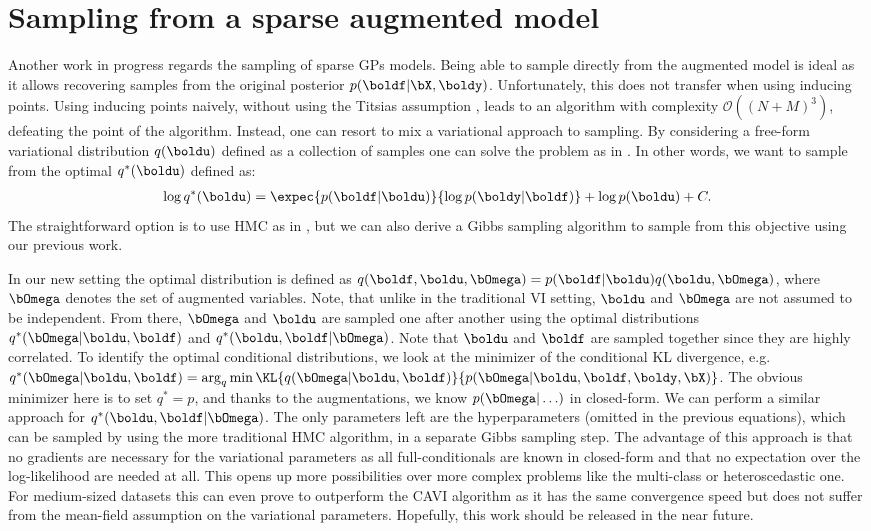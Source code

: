\section{Sampling from a sparse augmented model}

Another work in progress regards the sampling of sparse \ac{GPs} models.
Being able to sample directly from the augmented model is ideal as it allows recovering samples from the original posterior $p(\boldf|\bX,\boldy)$.
Unfortunately, this does not transfer when using inducing points.
Using inducing points naively, without using the Titsias assumption \cite{Titsias2009}, leads to an algorithm with complexity $\mathcal{O}((N+M)^3)$, defeating the point of the algorithm.
Instead, one can resort to mix a variational approach to sampling.
By considering a free-form variational distribution $q(\boldu)$ defined as a collection of samples one can solve the problem as in \citet{hensmanMCMCVariationallySparse2015}.
In other words, we want to sample from the optimal $q^*(\boldu)$ defined as:
\begin{align*}
    \log q^*(\boldu) = \expec{p(\boldf|\boldu)}{\log p(\boldy|\boldf)} + \log p(\boldu) + C.
\end{align*}
The straightforward option is to use \ac{HMC} as in \cite{hensmanMCMCVariationallySparse2015}, but we can also derive a Gibbs sampling algorithm to sample from this objective using our previous work.

In our new setting the optimal distribution is defined as $q(\boldf,\boldu,\bOmega) = p(\boldf|\boldu)q(\boldu, \bOmega)$, where $\bOmega$ denotes the set of augmented variables.
Note, that unlike in the traditional \ac{VI} setting, $\boldu$ and $\bOmega$ are not assumed to be independent.
From there, $\bOmega$ and $\boldu$ are sampled one after another using the optimal distributions $q^*(\bOmega|\boldu,\boldf)$ and $q^*(\boldu,\boldf|\bOmega)$.
Note that $\boldu$ and $\boldf$ are sampled together since they are highly correlated.
To identify the optimal conditional distributions, we look at the minimizer of the conditional \ac{KL} divergence, e.g. $q^*(\bOmega|\boldu,\boldf) = \arg_{q} \min \KL{q(\bOmega|\boldu,\boldf)}{p(\bOmega|\boldu,\boldf,\boldy,\bX)}$.
The obvious minimizer here is to set $q^*=p$, and thanks to the augmentations, we know $p(\bOmega|\ldots)$ in closed-form.
We can perform a similar approach for $q^*(\boldu,\boldf|\bOmega)$.
The only parameters left are the hyperparameters (omitted in the previous equations), which can be sampled by using the more traditional \ac{HMC} algorithm, in a separate Gibbs sampling step.
The advantage of this approach is that no gradients are necessary for the variational parameters as all full-conditionals are known in closed-form and that no expectation over the log-likelihood are needed at all.
This opens up more possibilities over more complex problems like the multi-class or heteroscedastic one.
For medium-sized datasets this can even prove to outperform the \ac{CAVI} algorithm as it has the same convergence speed but does not suffer from the mean-field assumption on the variational parameters.
Hopefully, this work should be released in the near future.

